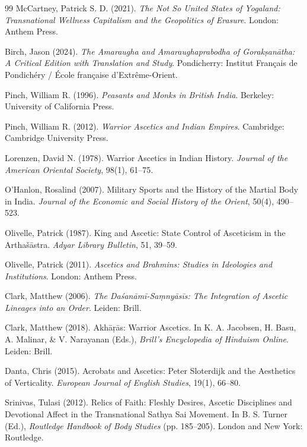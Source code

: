 \documentclass[11pt,twoside,letterpaper]{article}
\begin{document}
\begin{thebibliography}{99}
McCartney, Patrick S. D. (2021). \textit{The Not So United States of Yogaland: Transnational Wellness Capitalism and the Geopolitics of Erasure}. London: Anthem Press.

Birch, Jason (2024). \textit{The Amaraugha and Amaraughaprabodha of Gorakṣanātha: A Critical Edition with Translation and Study}. Pondicherry: Institut Français de Pondichéry / École française d'Extrême-Orient.

Pinch, William R. (1996). \textit{Peasants and Monks in British India}. Berkeley: University of California Press.

Pinch, William R. (2012). \textit{Warrior Ascetics and Indian Empires}. Cambridge: Cambridge University Press.

Lorenzen, David N. (1978). Warrior Ascetics in Indian History. \textit{Journal of the American Oriental Society}, 98(1), 61--75.

O'Hanlon, Rosalind (2007). Military Sports and the History of the Martial Body in India. \textit{Journal of the Economic and Social History of the Orient}, 50(4), 490--523.

Olivelle, Patrick (1987). King and Ascetic: State Control of Asceticism in the Artha\v{s}\={a}stra. \textit{Adyar Library Bulletin}, 51, 39--59.

Olivelle, Patrick (2011). \textit{Ascetics and Brahmins: Studies in Ideologies and Institutions}. London: Anthem Press.

Clark, Matthew (2006). \textit{The Daśanāmī-Saṃnyāsīs: The Integration of Ascetic Lineages into an Order}. Leiden: Brill.

Clark, Matthew (2018). Akhāṛās: Warrior Ascetics. In K. A. Jacobsen, H. Basu, A. Malinar, \& V. Narayanan (Eds.), \textit{Brill’s Encyclopedia of Hinduism Online}. Leiden: Brill.

Danta, Chris (2015). Acrobats and Ascetics: Peter Sloterdijk and the Aesthetics of Verticality. \textit{European Journal of English Studies}, 19(1), 66--80.

Srinivas, Tulasi (2012). Relics of Faith: Fleshly Desires, Ascetic Disciplines and Devotional Affect in the Transnational Sathya Sai Movement. In B. S. Turner (Ed.), \textit{Routledge Handbook of Body Studies} (pp. 185--205). London and New York: Routledge.


\end{thebibliography}
\end{document}

